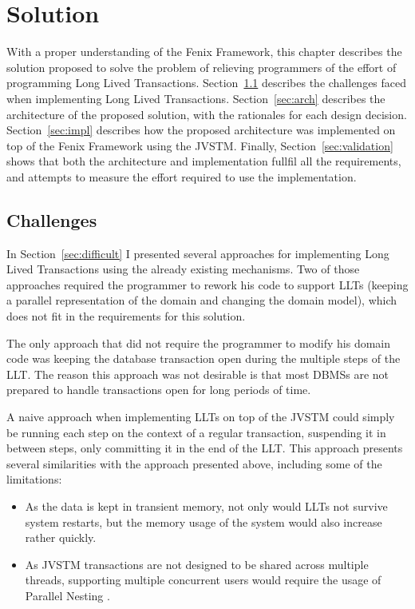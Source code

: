 \chapter{Solution}
\label{chap:solution}

With a proper understanding of the Fenix Framework, this chapter
describes the solution proposed to solve the problem of relieving
programmers of the effort of programming Long Lived
Transactions. Section~\ref{sec:challenges} describes the challenges
faced when implementing Long Lived
Transactions. Section~\ref{sec:arch} describes the architecture of the
proposed solution, with the rationales for each design
decision. Section~\ref{sec:impl} describes how the proposed
architecture was implemented on top of the Fenix Framework using the
JVSTM. Finally, Section~\ref{sec:validation} shows that both the
architecture and implementation fullfil all the requirements, and
attempts to measure the effort required to use the implementation.

\section{Challenges}
\label{sec:challenges}

In Section~\ref{sec:difficult} I presented several approaches for
implementing Long Lived Transactions using the already existing
mechanisms. Two of those approaches required the programmer to rework
his code to support LLTs (keeping a parallel representation of the
domain and changing the domain model), which does not fit in the
requirements for this solution.

The only approach that did not require the programmer to modify his
domain code was keeping the database transaction open during the
multiple steps of the LLT. The reason this approach was not desirable
is that most DBMSs are not prepared to handle transactions open for
long periods of time.

A naive approach when implementing LLTs on top of the JVSTM could
simply be running each step on the context of a regular transaction,
suspending it in between steps, only committing it in the end of the
LLT. This approach presents several similarities with the approach
presented above, including some of the limitations:

\begin{itemize}

\item As the data is kept in transient memory, not only would LLTs not
  survive system restarts, but the memory usage of the system would
  also increase rather quickly.

\item As JVSTM transactions are not designed to be shared across
  multiple threads, supporting multiple concurrent users would
  require the usage of Parallel Nesting
  \cite{NunoMiguelLourencoDiegues2012}.

\end{itemize}

